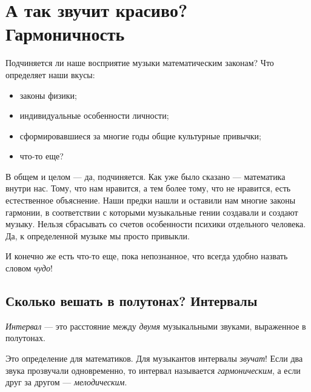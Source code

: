 \chapter{А так звучит красиво? Гармоничность}
\label{ch:harmony}


Подчиняется ли наше восприятие музыки математическим законам? Что определяет наши вкусы:
\begin{itemize}
    \item законы физики;
    \item индивидуальные особенности личности;
    \item сформировавшиеся за многие годы общие культурные привычки;
    \item что-то еще?
\end{itemize}

В общем и целом --- да, подчиняется. Как уже было сказано --- математика внутри нас. Тому, что нам нравится, а тем более тому, что не нравится, есть естественное объяснение. Наши предки нашли и оставили нам многие законы гармонии, в соответствии с которыми музыкальные гении создавали и создают музыку. Нельзя сбрасывать со счетов особенности психики отдельного человека. Да, к определенной музыке мы просто привыкли.

И конечно же есть что-то еще, пока непознанное, что всегда удобно назвать словом \emph{чудо}!


\section{Сколько вешать в полутонах? Интервалы}
\label{ch:harmony:interval}

\begin{Definition}[Интервал]
    \emph{Интервал} --- это расстояние между \emph{двумя} музыкальными звуками, выраженное в полутонах. 
\end{Definition}

Это определение для математиков. Для музыкантов интервалы \emph{звучат}! Если два звука прозвучали одновременно, то интервал называется \emph{гармоническим}, а если друг за другом --- \emph{мелодическим}.

